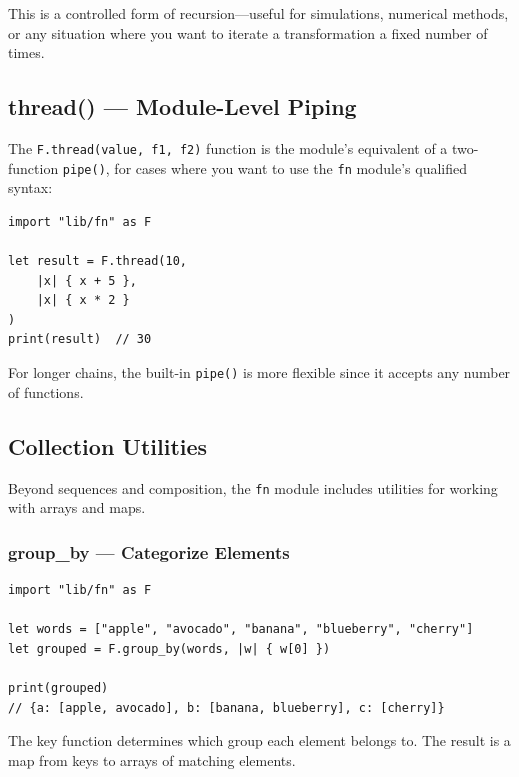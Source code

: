 This is a controlled form of recursion---useful for simulations, numerical methods, or any situation where you want to iterate a transformation a fixed number of times.

\subsection{thread() --- Module-Level Piping}\label{subsec:fn-thread}

The \lstinline|F.thread(value, f1, f2)| function is the module's equivalent of a two-function \lstinline|pipe()|, for cases where you want to use the \lstinline|fn| module's qualified syntax:

\begin{lstlisting}[language=Lattice, caption={thread for 2-step piping}]
import "lib/fn" as F

let result = F.thread(10,
    |x| { x + 5 },
    |x| { x * 2 }
)
print(result)  // 30
\end{lstlisting}

For longer chains, the built-in \lstinline|pipe()| is more flexible since it accepts any number of functions.

\subsection{Collection Utilities}\label{subsec:fn-collections}

Beyond sequences and composition, the \lstinline|fn| module includes utilities for working with arrays and maps.

\subsubsection{group\_by --- Categorize Elements}

\begin{lstlisting}[language=Lattice, caption={Grouping elements}]
import "lib/fn" as F

let words = ["apple", "avocado", "banana", "blueberry", "cherry"]
let grouped = F.group_by(words, |w| { w[0] })

print(grouped)
// {a: [apple, avocado], b: [banana, blueberry], c: [cherry]}
\end{lstlisting}

The key function determines which group each element belongs to.
The result is a map from keys to arrays of matching elements.

